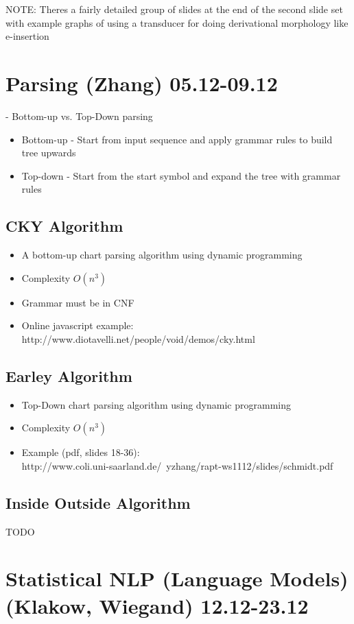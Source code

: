 \documentclass[11pt]{article}
\begin{document}
NOTE: Theres a fairly detailed group of slides at the end of the second slide set with example graphs  of using a transducer for doing derivational morphology like e-insertion


\section{Parsing (Zhang) 05.12-09.12}

- Bottom-up vs. Top-Down parsing
\begin{itemize}
 \item Bottom-up - Start from input sequence and apply grammar rules to build tree upwards
 \item Top-down - Start from the start symbol and expand the tree with grammar rules
\end{itemize}
\subsection{ CKY Algorithm }
\begin{itemize}
 \item A bottom-up chart parsing algorithm using dynamic programming
 \item Complexity $O(n^3)$ 
 \item Grammar must be in CNF
 \item Online javascript example: http://www.diotavelli.net/people/void/demos/cky.html
\end{itemize}
\subsection{ Earley Algorithm }
\begin{itemize}
 \item Top-Down chart parsing algorithm using dynamic programming
 \item Complexity $O(n^3)$
 \item Example (pdf, slides 18-36): \\http://www.coli.uni-saarland.de/~yzhang/rapt-ws1112/slides/schmidt.pdf
\end{itemize}
\subsection { Inside Outside Algorithm }
TODO


\section{Statistical NLP (Language Models) (Klakow, Wiegand) 12.12-23.12}
%
\end{document}

